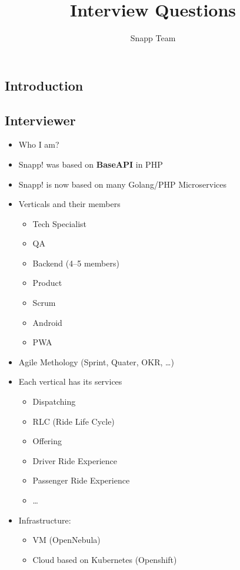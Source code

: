 \documentclass[]{article}
\begin{document}
\title{Interview Questions}
\author{Snapp Team}

\maketitle

\begin{multicols}{2}

\section{Introduction}

\subsection{Interviewer}
\begin{itemize}
  \item Who I am?
  \item Snapp! was based on \textbf{BaseAPI} in PHP
  \item Snapp! is now based on many Golang/PHP Microservices
  \item Verticals and their members
  \begin{itemize}
    \item Tech Specialist
    \item QA
    \item Backend (4--5 members)
    \item Product
    \item Scrum
    \item Android
    \item PWA
  \end{itemize}
  \item Agile Methology (Sprint, Quater, OKR, \ldots)
  \item Each vertical has its services
  \begin{itemize}
    \item Dispatching
    \item RLC (Ride Life Cycle)
    \item Offering
    \item Driver Ride Experience
    \item Passenger Ride Experience
    \item \ldots
  \end{itemize}
  \item Infrastructure:
    \begin{itemize}
      \item VM (OpenNebula)
      \item Cloud based on Kubernetes (Openshift)
    \end{itemize}
\end{itemize}


\end{multicols}
\end{document}
